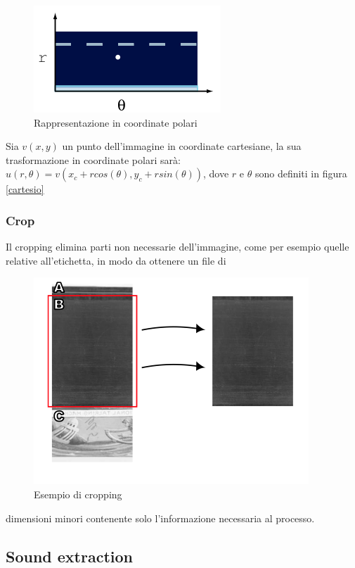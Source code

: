 \begin{figure}[h!t]
\begin{center}
\includegraphics[scale=0.5]{./img/polare.png}
\caption{Rappresentazione in coordinate polari}
\end{center}
\end{figure}
Sia $v(x,y)$ un punto dell'immagine in coordinate cartesiane, la sua trasformazione in coordinate polari sar\`a: $u(r,\theta) = v(x_c+rcos(\theta), y_c+rsin(\theta))$, dove $r$ e $\theta$ sono definiti in figura \ref{cartesio}
\subsubsection{Crop}
Il cropping elimina parti non necessarie dell'immagine, come per esempio quelle relative all'etichetta, in modo da ottenere un file di
\begin{figure}[h!t]
\begin{center}
\includegraphics[scale=0.6]{./img/cropping.png}
\caption{Esempio di cropping}
\end{center}
\end{figure}
 dimensioni minori contenente solo l'informazione necessaria al processo.
\subsection{Sound extraction}

